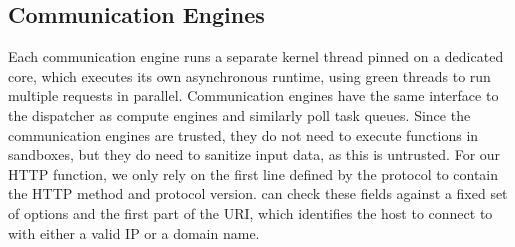 \subsection{Communication Engines}\label{sec:comm-engines}

Each communication engine runs a separate kernel thread pinned on a dedicated core, which executes its own asynchronous runtime, using green threads to run multiple requests in parallel. Communication engines have the same interface to the dispatcher as compute engines and similarly poll task queues. Since the communication engines are trusted, they do not need to execute functions in sandboxes, but they do need to sanitize input data, as this is untrusted.
For our HTTP function, we only rely on the first line defined by the protocol to contain the HTTP method and protocol version. \dandelion can check these fields against a fixed set of options and the first part of the URI, which identifies the host to connect to with either a valid IP or a domain name.
